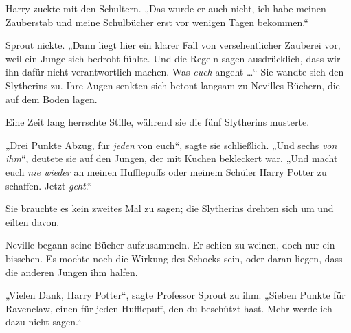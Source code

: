 Harry zuckte mit den Schultern.
„Das wurde er auch nicht, ich habe meinen Zauberstab und meine Schulbücher erst vor wenigen Tagen bekommen.“

Sprout nickte.
„Dann liegt hier ein klarer Fall von versehentlicher Zauberei vor, weil ein Junge sich bedroht fühlte. Und die Regeln sagen ausdrücklich, dass wir ihn dafür nicht verantwortlich machen. Was \emph{euch} angeht …“ Sie wandte sich den Slytherins zu. Ihre Augen senkten sich betont langsam zu Nevilles Büchern, die auf dem Boden lagen.

Eine Zeit lang herrschte Stille, während sie die fünf Slytherins musterte.

„Drei Punkte Abzug, für \emph{jeden} von euch“, sagte sie schließlich.
„Und sechs \emph{von ihm}“, deutete sie auf den Jungen, der mit Kuchen bekleckert war.
„Und macht euch \emph{nie wieder} an meinen Hufflepuffs oder meinem Schüler Harry Potter zu schaffen. Jetzt \emph{geht}.“

Sie brauchte es kein zweites Mal zu sagen; die Slytherins drehten sich um und eilten davon.

Neville begann seine Bücher aufzusammeln. Er schien zu weinen, doch nur ein bisschen. Es mochte noch die Wirkung des Schocks sein, oder daran liegen, dass die anderen Jungen ihm halfen.

„Vielen Dank, Harry Potter“, sagte Professor Sprout zu ihm.
„Sieben Punkte für Ravenclaw, einen für jeden Hufflepuff, den du beschützt hast. Mehr werde ich dazu nicht sagen.“

